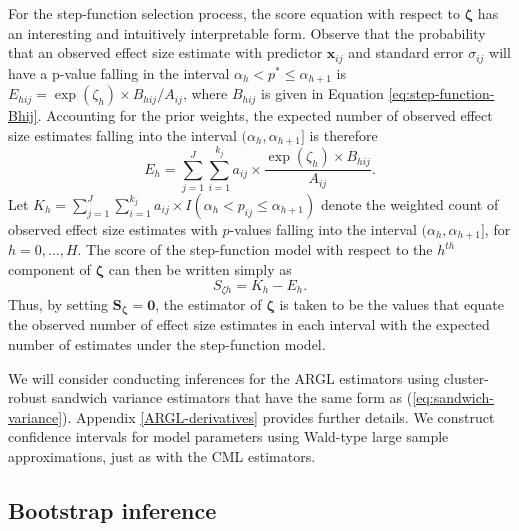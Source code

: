 \documentclass[
  american,
  man, donotrepeattitle,floatsintext]{apa7}
\begin{document}
For the step-function selection process, the score equation with respect to \(\boldsymbol\zeta\) has an interesting and intuitively interpretable form.
Observe that the probability that an observed effect size estimate with predictor \(\mathbf{x}_{ij}\) and standard error \(\sigma_{ij}\) will have a p-value falling in the interval \(\alpha_h < p^* \leq \alpha_{h+1}\) is \(E_{hij} = \exp(\zeta_h) \times B_{hij} / A_{ij}\), where \(B_{hij}\) is given in Equation \eqref{eq:step-function-Bhij}.
Accounting for the prior weights, the expected number of observed effect size estimates falling into the interval \((\alpha_h, \alpha_{h+1}]\) is therefore
\begin{equation}
\label{eq:expected-h}
E_h = \sum_{j=1}^J \sum_{i=1}^{k_j} a_{ij} \times \frac{\exp(\zeta_h) \times B_{hij}}{A_{ij}}.
\end{equation}
Let \(K_h = \sum_{j=1}^J \sum_{i=1}^{k_j} a_{ij} \times I\left(\alpha_h < p_{ij} \leq \alpha_{h+1}\right)\) denote the weighted count of observed effect size estimates with \(p\)-values falling into the interval \((\alpha_h, \alpha_{h+1}]\), for \(h = 0,...,H\).
The score of the step-function model with respect to the \(h^{th}\) component of \(\boldsymbol\zeta\) can then be written simply as
\begin{equation}
S_{\zeta h} = K_h - E_h.
\end{equation}
Thus, by setting \(\mathbf{S}_{\boldsymbol\zeta} = \mathbf{0}\), the estimator of \(\boldsymbol\zeta\) is taken to be the values that equate the observed number of effect size estimates in each interval with the expected number of estimates under the step-function model.

We will consider conducting inferences for the ARGL estimators using cluster-robust sandwich variance estimators that have the same form as (\ref{eq:sandwich-variance}).
Appendix \ref{ARGL-derivatives} provides further details.
We construct confidence intervals for model parameters using Wald-type large sample approximations, just as with the CML estimators.

\subsection{Bootstrap inference}\label{bootstrap-inference}
\end{document}
